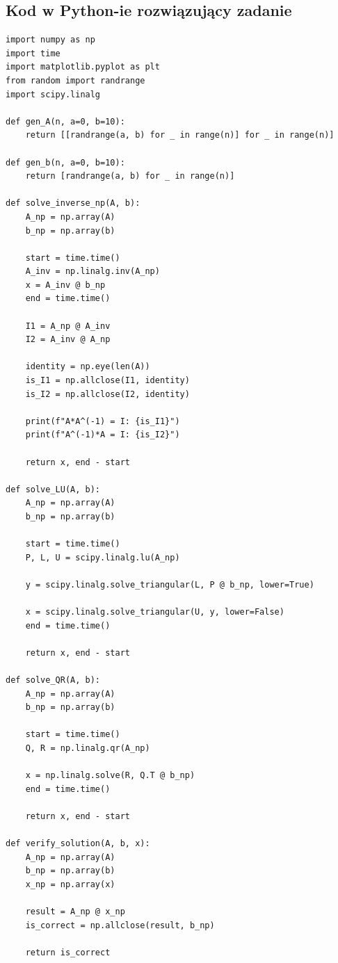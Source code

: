 \documentclass[a4paper,12pt]{article}
\begin{document}
\subsection{Kod w Python-ie rozwiązujący zadanie}

\begin{lstlisting}
import numpy as np
import time
import matplotlib.pyplot as plt
from random import randrange
import scipy.linalg

def gen_A(n, a=0, b=10):
    return [[randrange(a, b) for _ in range(n)] for _ in range(n)]

def gen_b(n, a=0, b=10):
    return [randrange(a, b) for _ in range(n)]

def solve_inverse_np(A, b):
    A_np = np.array(A)
    b_np = np.array(b)
    
    start = time.time()
    A_inv = np.linalg.inv(A_np)
    x = A_inv @ b_np
    end = time.time()
    
    I1 = A_np @ A_inv
    I2 = A_inv @ A_np
    
    identity = np.eye(len(A))
    is_I1 = np.allclose(I1, identity)
    is_I2 = np.allclose(I2, identity)
    
    print(f"A*A^(-1) = I: {is_I1}")
    print(f"A^(-1)*A = I: {is_I2}")
    
    return x, end - start

def solve_LU(A, b):
    A_np = np.array(A)
    b_np = np.array(b)
    
    start = time.time()
    P, L, U = scipy.linalg.lu(A_np)
    
    y = scipy.linalg.solve_triangular(L, P @ b_np, lower=True)
    
    x = scipy.linalg.solve_triangular(U, y, lower=False)
    end = time.time()
    
    return x, end - start

def solve_QR(A, b):
    A_np = np.array(A)
    b_np = np.array(b)
    
    start = time.time()
    Q, R = np.linalg.qr(A_np)
    
    x = np.linalg.solve(R, Q.T @ b_np)
    end = time.time()
    
    return x, end - start

def verify_solution(A, b, x):
    A_np = np.array(A)
    b_np = np.array(b)
    x_np = np.array(x)
    
    result = A_np @ x_np
    is_correct = np.allclose(result, b_np)
    
    return is_correct


\end{lstlisting}
\end{document}
